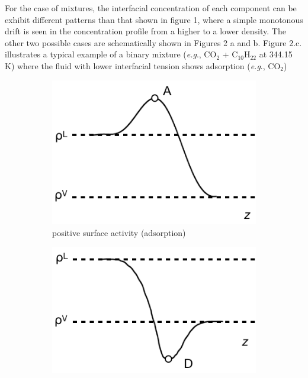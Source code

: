 \documentclass[9pt,bestpractices]{livecoms}
\begin{document}
For the case of mixtures, the interfacial concentration of each component can
be exhibit different patterns than that shown in figure 1, where a simple
monotonous drift is seen in the concentration profile from a higher to a lower
density. The other two possible cases are schematically shown in Figures
2 a and b. Figure 2.c. illustrates a typical example of a binary mixture
(\textit{e.g}., CO$_{2}$ + C$_{10}$H$_{22}$ at 344.15 K) where the fluid with
lower interfacial tension shows adsorption (\textit{e.g}., CO$_{2}$)


\begin{figure}
	\centering
	\begin{subfigure}{0.2\textwidth} %
    \includegraphics[width=1\textwidth]{gfx/image2.png}
		\caption{positive surface activity (adsorption)} %
	\end{subfigure}
	\hspace{1em} %
	\begin{subfigure}{0.2\textwidth} %
    \includegraphics[width=1\textwidth]{gfx/image3.png}

\end{subfigure}
\end{figure}
\end{document}

